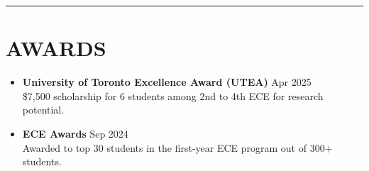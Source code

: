 \documentclass[letterpaper,10pt]{article}
\begin{document}
\noindent\rule{\linewidth}{1pt}

\section*{\textbf{AWARDS}}
\begin{itemize}[leftmargin=0.2in]
	\item \textbf{University of Toronto Excellence Award (UTEA)} \hfill Apr 2025\\
    \$7,500 scholarship for 6 students among 2nd to 4th ECE for research potential.
	\item \textbf{ECE Awards} \hfill Sep 2024\\
	Awarded to top 30 students in the first-year ECE program out of 300+ students.
\end{itemize}
\end{document}
